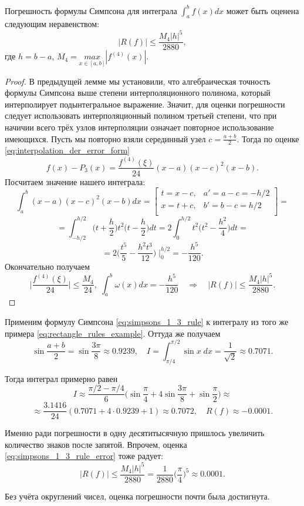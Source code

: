 \documentclass[../main.tex]{subfile}
\begin{document}
\begin{theorem}
\label{eq:simpsons_1_3_rule_error}
	Погрешность формулы Симпсона для интеграла $\int_a^b f(x)dx$ может быть
	оценена следующим неравенством:
	\[\boxed{|R(f)|\le\frac{M_4|h|^5}{2880}},\]
	где $h=b-a$, $M_4=\underset{x\in[a,b]}{max}|f^{(4)}(x)|.$
\end{theorem}

\begin{proof}
	В предыдущей лемме мы установили, что алгебраическая точность формулы
	Симпсона выше степени интерполяционного полинома, который интерполирует
	подынтегральное выражение. Значит, для оценки погрешности следует
	использовать интерполяционный полином третьей степени, что при начичии
	всего трёх узлов интерполяции означает повторное использование
	имеющихся. Пусть мы повторно взяли серединный узел $c=\frac{a+b}{2}$.
	Тогда по оценке \eqref{eq:interpolation_der_error_form}
	\[f(x)-P_3(x)=\frac{f^{(4)}(\xi)}{24}(x-a)(x-c)^2(x-b).\]
	Посчитаем значение нашего интеграла:
	\[\int_a^b (x-a)(x-c)^2(x-b)dx=
		\begin{bmatrix}
			t=x-c,	& a'=a-c=-h/2 \\
			x=t+c,	& b'=b-c=h/2\\
		\end{bmatrix}
		=
	\]
	\[=\int_{-h/2}^{h/2}\Big(t+\frac{h}{2}\Big)t^2\Big(t-\frac{h}{2}\Big)dt=
	2\int_0^{h/2}t^2\Big(t^2-\frac{h^2}{4}\Big)dt=\]
	\[=2\Big(\frac{t^5}{5}-\frac{h^2t^3}{12}\Big)\;\Big|_0^{h/2}=
	-\frac{h^5}{120}.\]
	Окончательно получаем
	\[\Big|\frac{f^{(4)}(\xi)}{24}\Big|\le\frac{M_4}{24},\;\int_a^b\omega(x)
	dx=-\frac{h^5}{120}\quad\Rightarrow\quad|R(f)|\le\frac{M_4|h|^5}{2880}.\]
\end{proof}

\begin{example}\label{eq:simpsons_1_3_rule_example}
	Применим формулу Симпсона \eqref{eq:simpsons_1_3_rule} к интегралу из
	того же примера \eqref{eq:rectangle_rules_example}. Оттуда же получаем
	\[\sin{\frac{a+b}{2}}=\sin{\frac{3\pi}{8}}\approx 0.9239,\quad
	I=\int_{\pi/4}^{\pi/2}\sin x\;dx=\frac{1}{\sqrt 2}\approx 0.7071.\]

	Тогда интеграл примерно равен
	\[I\approx\frac{\pi/2-\pi/4}{6}\Big(\sin\frac{\pi}{4}+4\sin\frac{3\pi}
	{8}+\sin\frac{\pi}{2}\Big)\approx\]
	\[\approx\frac{3.1416}{24}(0.7071+4\cdot0.9239+1)\approx0.7072,\quad
	R(f)\approx -0.0001.\]

	Именно ради погрешности в одну десятитысячную пришлось увеличить
	количество знаков после запятой. Впрочем, оценка
	\eqref{eq:simpsons_1_3_rule_error} тоже радует:
	\[|R(f)|\le\frac{M_4|h|^5}{2880}=\frac{1}{2880}\Big(\frac{\pi}{4}
	\Big)^5\approx 0.0001.\]

	Без учёта округлений чисел, оценка погрешности почти была достигнута.
\end{example}
\end{document}
